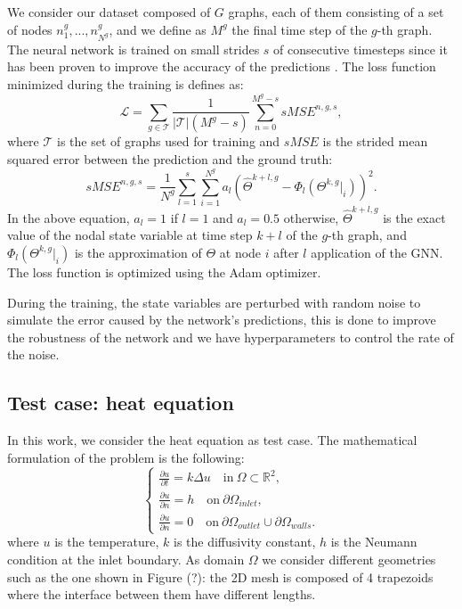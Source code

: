 \documentclass[11pt,a4paper]{article}
\begin{document}
We consider our dataset composed of \(G\) graphs, each of them consisting of a set of nodes \(n_1^g,...,n_{N^g}^g\), and we define as \(M^g\) the final time step of the \(g\)-th graph.
The neural network is trained on small strides \(s\) of consecutive timesteps since it has been proven to improve the accuracy of the predictions \cite{Luca}.
The loss function minimized during the training is defines as:
\begin{equation}
    \mathcal{L} = \sum_{g \in \mathcal{T}} \frac{1}{|\mathcal{T}|(M^g-s)} \sum_{n=0}^{M^g-s} sMSE^{n,g,s},
\end{equation}
where \(\mathcal{T}\) is the set of graphs used for training and \(sMSE\) is the strided mean squared error between the prediction and the ground truth:
\begin{equation}
    sMSE^{n,g,s} = \frac{1}{N^g} \sum_{l=1}^{s} \sum_{i=1}^{N^g} a_l (\hat{\Theta}^{k+l,g} - \Phi_l(\Theta^{k,g}|_i))^2.
    \label{mse}
\end{equation}
In the above equation, \(a_l=1\) if \(l=1\) and \(a_l=0.5\) otherwise, \(\hat{\Theta}^{k+l,g}\) is the exact value of the nodal state variable at time step \(k+l\) of the \(g\)-th graph, and \(\Phi_l(\Theta^{k,g}|_i)\) is the approximation of \(\Theta\) at node \(i\) after \(l\) application of the GNN. 
The loss function is optimized using the Adam optimizer.

During the training, the state variables are perturbed with random noise to simulate the error caused by the network's predictions, this is done to improve the robustness of the network and we have hyperparameters to control the rate of the noise.

\subsection{Test case: heat equation}
\label{testcase}

In this work, we consider the heat equation as test case. 
The mathematical formulation of the problem is the following:
\begin{equation}
    \begin{cases}
        \frac{\partial u }{\partial t} = k \Delta u \quad \text{in} \ \Omega \subset \mathbb{R}^2, \\
        \frac{\partial u}{\partial n} = h \quad \text{on} \ \partial \Omega_{inlet}, \\
        \frac{\partial u}{\partial n} = 0 \quad \text{on} \ \partial \Omega_{outlet} 
        \cup \partial \Omega_{walls}.
    \end{cases}
\end{equation}
where \(u\) is the temperature, \(k\) is the diffusivity constant, \(h\) is the Neumann condition at the inlet boundary. As domain \(\Omega\) we consider different geometries such as the one shown in Figure (?): the 2D mesh is composed of 4 trapezoids where the interface between them have different lengths.
\end{document}
